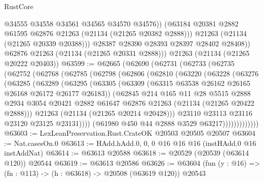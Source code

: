 \begin{lexlean}{RustCore}
\begin{coremodule}
                @34555
                @34558
                @34561
                @34565
                @34570
                @34576))
            (@63184 @20381 @2882 @61595 @62876 @21263 (@21134 (@21265 @20382 @2888)))
            @21263
            (@21134 (@21265 @20339 @20388)))
          @28387
          @28390
          @28393
          @28397
          @28402
          @28408))
      @62876
      @21263
      (@21134 (@21265 @20331 @2888)))
    @21263
    (@21134 (@21265 @20222 @20403))
@63599 := @62665
    (@62690
      (@62731
        (@62733
          (@62735
            (@62752
              (@62768
                (@62785
                  (@62798
                    (@62806
                      (@62810
                        (@63220
                          (@63228
                            (@63276
                              (@63285
                                (@63289
                                  (@63295
                                    (@63305
                                      (@63309
                                        (@63315 @63538 @26162 @26165 @26168 @26172 @26177 @26183))
                                      (@62845
                                        @214
                                        @165
                                        @11
                                        @28
                                        @5515
                                        @2888
                                        @2934
                                        @3054
                                        @20421
                                        @2882
                                        @61647
                                        @62876
                                        @21263
                                        (@21134 (@21265 @20422 @2888)))
                                      @21263
                                      (@21134 (@21265 @20214 @20428)))
                                    @23110
                                    @23113
                                    @23116
                                    @23120
                                    @23125
                                    @23131))))
                            (@61980 @450 @44 @2888 @3529 @63217)))))))))))))
@63603 := LexLeanPreservation.Rust.CrateOK @20503 @20505 @20507
@63604 := Nat.casesOn.{0}
@63613 := HAdd.hAdd.{0, 0, 0} @16 @16 @16 (instHAdd.{0} @16 instAddNat)
@63614 := @63613 @20588
@63618 := @20529 (@20539 (@63614 @120)) @20544
@63619 := @63613 @20586
@63626 := @63604 (fun (y : @16) => (fn : @113) -> (h : @63618) -> @20508 (@63619 @120)) @20543

\end{coremodule}
\end{lexlean}
